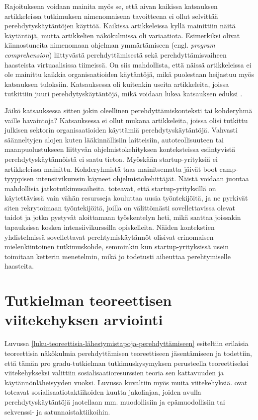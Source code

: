\documentclass[utf8]{gradu3}
\begin{document}
Rajoituksena voidaan mainita myös se, että aivan kaikissa katsauksen artikkeleissa tutkimuksen nimenomaisena tavoitteena ei ollut selvittää perehdytyskäytäntöjen käyttöä. Kaikissa artikkeleissa kyllä mainittiin näitä käytäntöjä, mutta artikkelien näkökulmissa oli variaatiota. Esimerkiksi \textcite{yates-ym-2020} olivat kiinnostuneita nimenomaan ohjelman ymmärtämiseen (engl. \textit{program comprehension}) liittyvästä perehdyttämisestä sekä \textcite{hemphill-begel-2011} perehdyttämisvaiheen haasteista virtuaalisissa tiimeissä. On siis mahdollista, että näissä artikkeleissa ei ole mainittu kaikkia organisaatioiden käytäntöjä, mikä puolestaan heijastuu myös katsauksen tuloksiin. Katsauksessa oli kuitenkin useita artikkeleita, joissa tutkittiin juuri perehdytyskäytäntöjä, mikä voidaan lukea katsauksen eduksi
%
\parencites%
    {ju-ym-2021}%
    {britto-ym-2020}%
    {moe-ym-2020}%
    {viviani-murphy-2019}%
    {buchan-ym-2019}%
    {johnson-senges-2010}%
\relax.
%

Jäikö katsauksessa sitten jokin oleellinen perehdyttämiskonteksti tai kohderyhmä vaille havaintoja? Katsauksessa ei ollut mukana artikkeleita, joissa olisi tutkittu julkisen sektorin organisaatioiden käyttämiä perehdytyskäytäntöjä. Vahvasti säänneltyjen alojen kuten lääkinnällisiin laitteisiin, autoteollisuuteen tai maanpuolustukseen liittyvän ohjelmistokehityksen konteksteissa esiintyvistä perehdytyskäytännöistä ei saatu tietoa. Myöskään startup-yrityksiä ei artikkeleissa mainittu. Kohderyhmistä taas mainitsematta jäivät boot camp-tyyppisen intensiivikurssin käyneet ohjelmistokehittäjät. Näistä voidaan juontaa mahdollisia jatkotutkimusaiheita. \textcite{lyon-green-2021} toteavat, että startup-yrityksillä on käytettävissä vain vähän resursseja kouluttaa uusia työntekijöitä, ja ne pyrkivät siten rekrytoimaan työntekijöitä, joilla on välittömästi sovellettavissa olevat taidot ja jotka pystyvät aloittamaan työskentelyn heti, mikä saattaa joissakin tapauksissa koskea intensiivikurssilla opiskelleita. Näiden kontekstien yhdistelmissä sovellettavat perehtymiskäytännöt olisivat erinomaisen mielenkiintoinen tutkimuskohde, semminkin kun startup-yrityksissä usein toimitaan ketterin menetelmin, mikä jo todetusti aiheuttaa perehtymiselle haasteita.

\section{Tutkielman teoreettisen viitekehyksen arviointi}

Luvussa \ref{luku-teoreettisia-lähestymistapoja-perehdyttämiseen} esiteltiin erilaisia teoreettisia näkökulmia perehdyttämisen teoreettiseen jäsentämiseen ja todettiin, että tämän pro gradu-tutkielman tutkimuskysymyksen perusteella teoreettiseksi viitekehykseksi valittiin sosialisaatioresurssien teoria sen kattavuuden ja käytännönläheisyyden vuoksi. Luvussa kuvaltiin myös muita viitekehyksiä. \textcite{van-maanen-schein-1979} ovat toteavat sosialisaatiotaktiikoiden kuutta jakolinjaa, joiden avulla perehdytyskäytäntöjä jaotellaan mm. muodollisiin ja epämuodollisiin tai sekvenssi- ja satunnaistaktiikoihin. 
\end{document}
